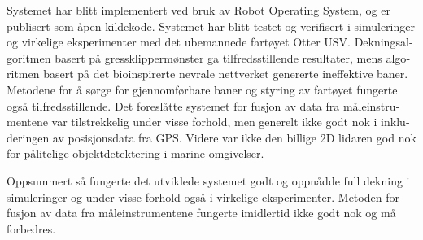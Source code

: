 \begin{otherlanguage}{norsk}
Systemet har blitt implementert ved bruk av Robot Operating System, og er publisert som åpen kildekode. Systemet har blitt testet og verifisert i simuleringer og virkelige eksperimenter med det ubemannede fartøyet Otter USV. Dekningsalgoritmen basert på gressklippermønster ga tilfredsstillende resultater, mens algoritmen basert på det bioinspirerte nevrale nettverket genererte ineffektive baner. Metodene for å sørge for gjennomførbare baner og styring av fartøyet fungerte også tilfredsstillende. Det foreslåtte systemet for fusjon av data fra måleinstrumentene var tilstrekkelig under visse forhold, men generelt ikke godt nok i inkluderingen av posisjonsdata fra GPS. Videre var ikke den billige 2D lidaren god nok for pålitelige objektdetektering i marine omgivelser.

Oppsummert så fungerte det utviklede systemet godt og oppnådde full dekning i simuleringer og under visse forhold også i virkelige eksperimenter. Metoden for fusjon av data fra måleinstrumentene fungerte imidlertid ikke godt nok og må forbedres.

\end{otherlanguage}

\restoregeometry

\clearpage

